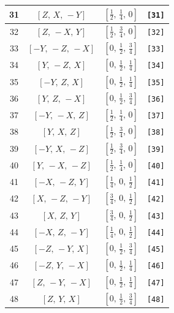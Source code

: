 \documentclass[fleqn,8pt]{jsarticle}
\begin{document}
\begin{longtable}{cccc}
31 & $\left[ Z,\, X,\, - Y \right]$ & $\left[ \frac{1}{2},\, \frac{1}{4},\, 0 \right]$ & {\tt [31]} \\ \hline
32 & $\left[ Z,\, - X,\, Y \right]$ & $\left[ \frac{1}{2},\, \frac{3}{4},\, 0 \right]$ & {\tt [32]} \\ \hline
33 & $\left[ - Y,\, - Z,\, - X \right]$ & $\left[ 0,\, \frac{1}{2},\, \frac{3}{4} \right]$ & {\tt [33]} \\ \hline
34 & $\left[ Y,\, - Z,\, X \right]$ & $\left[ 0,\, \frac{1}{2},\, \frac{1}{4} \right]$ & {\tt [34]} \\ \hline
35 & $\left[ - Y,\, Z,\, X \right]$ & $\left[ 0,\, \frac{1}{2},\, \frac{1}{4} \right]$ & {\tt [35]} \\ \hline
36 & $\left[ Y,\, Z,\, - X \right]$ & $\left[ 0,\, \frac{1}{2},\, \frac{3}{4} \right]$ & {\tt [36]} \\ \hline
37 & $\left[ - Y,\, - X,\, Z \right]$ & $\left[ \frac{1}{2},\, \frac{1}{4},\, 0 \right]$ & {\tt [37]} \\ \hline
38 & $\left[ Y,\, X,\, Z \right]$ & $\left[ \frac{1}{2},\, \frac{3}{4},\, 0 \right]$ & {\tt [38]} \\ \hline
39 & $\left[ - Y,\, X,\, - Z \right]$ & $\left[ \frac{1}{2},\, \frac{3}{4},\, 0 \right]$ & {\tt [39]} \\ \hline
40 & $\left[ Y,\, - X,\, - Z \right]$ & $\left[ \frac{1}{2},\, \frac{1}{4},\, 0 \right]$ & {\tt [40]} \\ \hline
41 & $\left[ - X,\, - Z,\, Y \right]$ & $\left[ \frac{1}{4},\, 0,\, \frac{1}{2} \right]$ & {\tt [41]} \\ \hline
42 & $\left[ X,\, - Z,\, - Y \right]$ & $\left[ \frac{3}{4},\, 0,\, \frac{1}{2} \right]$ & {\tt [42]} \\ \hline
43 & $\left[ X,\, Z,\, Y \right]$ & $\left[ \frac{3}{4},\, 0,\, \frac{1}{2} \right]$ & {\tt [43]} \\ \hline
44 & $\left[ - X,\, Z,\, - Y \right]$ & $\left[ \frac{1}{4},\, 0,\, \frac{1}{2} \right]$ & {\tt [44]} \\ \hline
45 & $\left[ - Z,\, - Y,\, X \right]$ & $\left[ 0,\, \frac{1}{2},\, \frac{3}{4} \right]$ & {\tt [45]} \\ \hline
46 & $\left[ - Z,\, Y,\, - X \right]$ & $\left[ 0,\, \frac{1}{2},\, \frac{1}{4} \right]$ & {\tt [46]} \\ \hline
47 & $\left[ Z,\, - Y,\, - X \right]$ & $\left[ 0,\, \frac{1}{2},\, \frac{1}{4} \right]$ & {\tt [47]} \\ \hline
48 & $\left[ Z,\, Y,\, X \right]$ & $\left[ 0,\, \frac{1}{2},\, \frac{3}{4} \right]$ & {\tt [48]} \\
\end{longtable}
\end{document}
